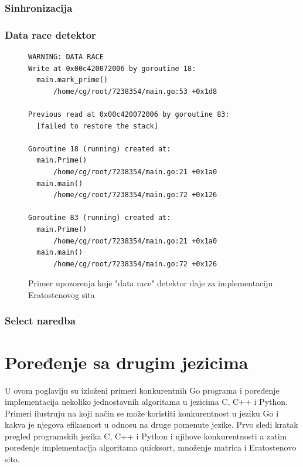\documentclass[12pt,oneside]{memoir}
\begin{document}
\subsection{Sinhronizacija}

\subsection{Data race detektor}

\begin{figure}
\begin{center}

\begin{Verbatim}[fontsize=\small]
WARNING: DATA RACE
Write at 0x00c420072006 by goroutine 18:
  main.mark_prime()
      /home/cg/root/7238354/main.go:53 +0x1d8

Previous read at 0x00c420072006 by goroutine 83:
  [failed to restore the stack]

Goroutine 18 (running) created at:
  main.Prime()
      /home/cg/root/7238354/main.go:21 +0x1a0
  main.main()
      /home/cg/root/7238354/main.go:72 +0x126

Goroutine 83 (running) created at:
  main.Prime()
      /home/cg/root/7238354/main.go:21 +0x1a0
  main.main()
      /home/cg/root/7238354/main.go:72 +0x126
\end{Verbatim}

\caption{Primer upozorenja koje "data race" detektor daje za implementaciju Eratostenovog sita}
\label{fig:datarace}
\end{center}
\end{figure}

\subsection{Select naredba}



\chapter {Poređenje sa drugim jezicima}
U ovom poglavlju su izloženi primeri konkurentnih Go programa i poređenje implementacija nekoliko jednostavnih algoritama u jezicima C, C++ i Python. Primeri ilustruju na koji način se može koristiti konkurentnost u jeziku Go i kakva je njegova efikasnost u odnosu na druge pomenute jezike. Prvo sledi kratak pregled programskih jezika C, C++ i Python i njihove konkurentnosti a zatim poređenje implementacija algoritama quicksort, množenje matrica i Eratostenovo sito.
\end{document}
